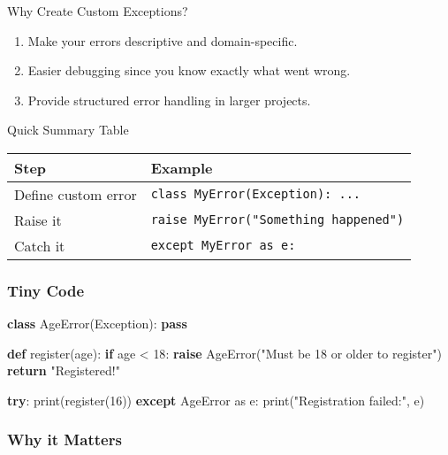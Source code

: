 \documentclass[
  letterpaper,
  DIV=11,
  numbers=noendperiod]{scrreprt}
\newenvironment{Shaded}{\begin{snugshade}}{\end{snugshade}}
\newcommand{\BuiltInTok}[1]{\textcolor[rgb]{0.00,0.23,0.31}{#1}}
\newcommand{\ControlFlowTok}[1]{\textcolor[rgb]{0.00,0.23,0.31}{\textbf{#1}}}
\newcommand{\DecValTok}[1]{\textcolor[rgb]{0.68,0.00,0.00}{#1}}
\newcommand{\ImportTok}[1]{\textcolor[rgb]{0.00,0.46,0.62}{#1}}
\newcommand{\KeywordTok}[1]{\textcolor[rgb]{0.00,0.23,0.31}{\textbf{#1}}}
\newcommand{\NormalTok}[1]{\textcolor[rgb]{0.00,0.23,0.31}{#1}}
\newcommand{\OperatorTok}[1]{\textcolor[rgb]{0.37,0.37,0.37}{#1}}
\newcommand{\PreprocessorTok}[1]{\textcolor[rgb]{0.68,0.00,0.00}{#1}}
\newcommand{\StringTok}[1]{\textcolor[rgb]{0.13,0.47,0.30}{#1}}
\providecommand{\tightlist}{%
  \setlength{\itemsep}{0pt}\setlength{\parskip}{0pt}}
\begin{document}
Why Create Custom Exceptions?

\begin{enumerate}
\def\labelenumi{\arabic{enumi}.}
\tightlist
\item
  Make your errors descriptive and domain-specific.
\item
  Easier debugging since you know exactly what went wrong.
\item
  Provide structured error handling in larger projects.
\end{enumerate}

Quick Summary Table

\begin{longtable}[]{@{}ll@{}}
\toprule\noalign{}
Step & Example \\
\midrule\noalign{}
\endhead
\bottomrule\noalign{}
\endlastfoot
Define custom error & \texttt{class\ MyError(Exception):\ ...} \\
Raise it & \texttt{raise\ MyError("Something\ happened")} \\
Catch it & \texttt{except\ MyError\ as\ e:} \\
\end{longtable}

\subsubsection{Tiny Code}\label{tiny-code-77}

\begin{Shaded}
\begin{Highlighting}[]
\KeywordTok{class}\NormalTok{ AgeError(}\PreprocessorTok{Exception}\NormalTok{):}
    \ControlFlowTok{pass}

\KeywordTok{def}\NormalTok{ register(age):}
    \ControlFlowTok{if}\NormalTok{ age }\OperatorTok{\textless{}} \DecValTok{18}\NormalTok{:}
        \ControlFlowTok{raise}\NormalTok{ AgeError(}\StringTok{"Must be 18 or older to register"}\NormalTok{)}
    \ControlFlowTok{return} \StringTok{"Registered!"}

\ControlFlowTok{try}\NormalTok{:}
    \BuiltInTok{print}\NormalTok{(register(}\DecValTok{16}\NormalTok{))}
\ControlFlowTok{except}\NormalTok{ AgeError }\ImportTok{as}\NormalTok{ e:}
    \BuiltInTok{print}\NormalTok{(}\StringTok{"Registration failed:"}\NormalTok{, e)}
\end{Highlighting}
\end{Shaded}

\subsubsection{Why it Matters}\label{why-it-matters-77}
\end{document}

